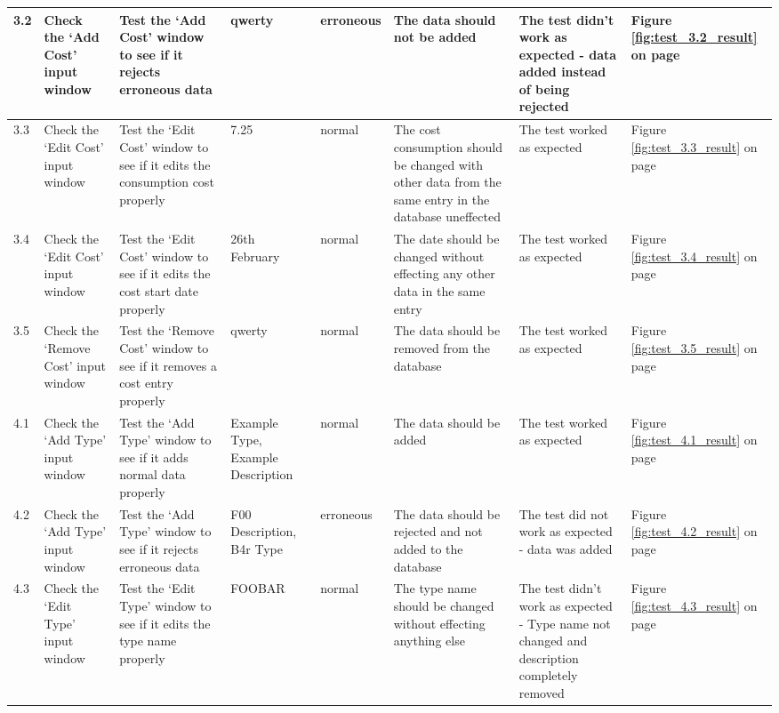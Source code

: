\begin{landscape}
\begin{center}
\begin{longtable}{|p{1.5cm}|p{2.5cm}|p{2.5cm}|p{2cm}|p{2cm}|p{2cm}|p{2cm}|p{2cm}|}
       3.2 & Check the `Add Cost' input window & Test the `Add Cost' window to see if it rejects erroneous data & qwerty & erroneous & The data should not be added &  The test didn't work as expected - data added instead of being rejected & Figure \ref{fig:test_3.2_result} on page \pageref{fig:test_3.2_result} \\ \hline
       3.3 & Check the `Edit Cost' input window & Test the `Edit Cost' window to see if it edits the consumption cost properly & 7.25 & normal & The cost consumption should be changed with other data from the same entry in the database uneffected & The test worked as expected & Figure \ref{fig:test_3.3_result} on page \pageref{fig:test_3.3_result} \\ \hline
       3.4 & Check the `Edit Cost' input window & Test the `Edit Cost' window to see if it edits the cost start date properly & 26th February & normal & The date should be changed without effecting any other data in the same entry & The test worked as expected & Figure \ref{fig:test_3.4_result} on page \pageref{fig:test_3.4_result}\\ \hline
       3.5 & Check the `Remove Cost' input window & Test the `Remove Cost' window to see if it removes a cost entry properly & qwerty & normal & The data should be removed from the database & The test worked as expected & Figure \ref{fig:test_3.5_result} on page \pageref{fig:test_3.5_result}\\ \hline
       4.1 & Check the `Add Type' input window & Test the `Add Type' window to see if it adds normal data properly & Example Type, Example Description & normal & The data should be added & The test worked as expected & Figure \ref{fig:test_4.1_result} on page \pageref{fig:test_4.1_result}\\ \hline
       4.2 & Check the `Add Type' input window & Test the `Add Type' window to see if it rejects erroneous data & F00 Description, B4r Type& erroneous & The data should be rejected and not added to the database & The test did not work as expected - data was added & Figure \ref{fig:test_4.2_result} on page \pageref{fig:test_4.2_result}\\ \hline
       4.3 & Check the `Edit Type' input window & Test the `Edit Type' window to see if it edits the type name properly & FOOBAR & normal & The type name should be changed without effecting anything else & The test didn't work as expected - Type name not changed and description completely removed & Figure \ref{fig:test_4.3_result} on page \pageref{fig:test_4.3_result}\\ \hline

\end{longtable}
\end{center}
\end{landscape}
